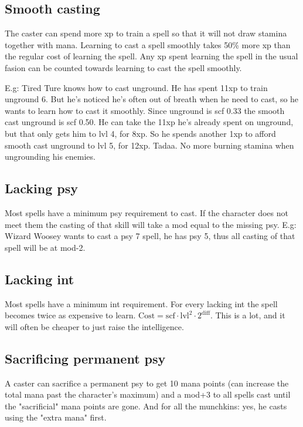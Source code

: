 \subsection*{Smooth casting}
The caster can spend more xp to train a spell so that it will not draw stamina together with mana. Learning to cast a spell smoothly takes 50\% more xp than the regular cost of learning the spell. Any xp spent learning the spell in the usual fasion can be counted towards learning to cast the spell smoothly.

E.g: Tired Ture knows how to cast unground. He has spent 11xp to train unground 6. But he's noticed he's often out of breath when he need to cast, so he wants to learn how to cast it smoothly. Since unground is scf 0.33 the smooth cast unground is scf 0.50. He can take the 11xp he's already spent on unground, but that only gets him to lvl 4, for 8xp. So he spends another 1xp to afford smooth cast unground to lvl 5, for 12xp. Tadaa. No more burning stamina when ungrounding his enemies.


\subsection*{Lacking psy}
Most spells have a minimum psy requirement to cast. If the character does not meet them the casting of that skill will take a mod equal to the missing psy.
E.g: Wizard Woosey wants to cast a psy 7 spell, he has psy 5, thus all casting of that spell will be at mod-2.


\subsection*{Lacking int}
Most spells have a minimum int requirement. For every lacking int the spell becomes twice as expensive to learn. $\mathrm{Cost} = \mathrm{scf} \cdot \mathrm{lvl}^2 \cdot 2^{\mathrm{diff}}$. This is a lot, and it will often be cheaper to just raise the intelligence.


\subsection*{Sacrificing permanent psy}
A caster can sacrifice a permanent psy to get 10 mana points (can increase the total mana past the character's maximum) and a mod+3 to all spells cast until the "sacrificial" mana points are gone. And for all the munchkins: yes, he casts using the "extra mana" first.

